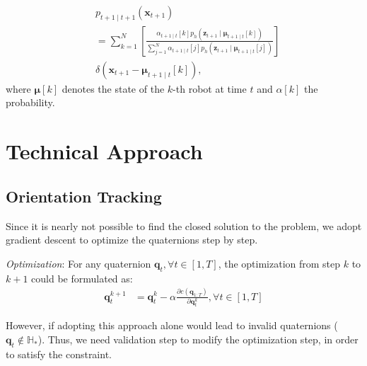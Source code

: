 \documentclass[conference]{IEEEtran}
\begin{document}
\begin{equation}
    \begin{aligned}
    &p_{t+1 \mid t+1}\left(\boldsymbol{x}_{t+1}\right) 
    \\&=\sum_{k=1}^N\left[\frac{\alpha_{t+1 \mid t}[k] p_h\left(\boldsymbol{z}_{t+1} \mid \boldsymbol{\mu}_{t+1 \mid t}[k]\right)}{\sum_{j=1}^N \alpha_{t+1 \mid t}[j] p_h\left(\boldsymbol{z}_{t+1} \mid \boldsymbol{\mu}_{t+1 \mid t}[j]\right)}\right] 
    \\ &\delta\left(\boldsymbol{x}_{t+1}-\boldsymbol{\mu}_{t+1 \mid t}[k]\right),
    \end{aligned}
\end{equation}
where $\boldsymbol{\mu}[k]$ denotes the state of the $k$-th robot at time $t$ and $\alpha[k]$ the probability.

\section{Technical Approach}
\subsection{Orientation Tracking}
Since it is nearly not possible to find the closed solution to the problem, we adopt gradient descent to optimize the
quaternions step by step.

\textit{Optimization}:
For any quaternion $\boldsymbol{q}_t, \forall t \in [1, T]$, the optimization from step $k$ to $k+1$ could be formulated as:
\begin{equation}
    \begin{aligned}
        \boldsymbol{q}_t^{k+1} & = \boldsymbol{q}_t^{k} - \alpha \frac{\partial c(\boldsymbol{q}_{1:T})}
        {\partial \boldsymbol{q}_t^{k}} , \forall t \in [1, T]
    \end{aligned}
\end{equation}

However, if adopting this approach alone would lead to invalid quaternions ($\boldsymbol{q}_t \notin \mathbb{H}_*$). Thus, we need
validation step to modify the optimization step, in order to satisfy the constraint.
\end{document}
